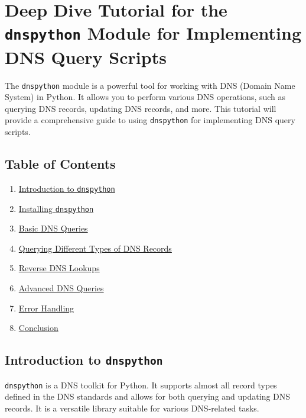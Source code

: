 \documentclass[
  letterpaper,
  DIV=11,
  numbers=noendperiod]{scrreprt}
\providecommand{\tightlist}{%
  \setlength{\itemsep}{0pt}\setlength{\parskip}{0pt}}\usepackage{longtable,booktabs,array}
\begin{document}

\chapter{\texorpdfstring{Deep Dive Tutorial for the \texttt{dnspython}
Module for Implementing DNS Query
Scripts}{Deep Dive Tutorial for the dnspython Module for Implementing DNS Query Scripts}}\label{deep-dive-tutorial-for-the-dnspython-module-for-implementing-dns-query-scripts}

The \texttt{dnspython} module is a powerful tool for working with DNS
(Domain Name System) in Python. It allows you to perform various DNS
operations, such as querying DNS records, updating DNS records, and
more. This tutorial will provide a comprehensive guide to using
\texttt{dnspython} for implementing DNS query scripts.

\section{Table of Contents}\label{table-of-contents-19}

\begin{enumerate}
\def\labelenumi{\arabic{enumi}.}
\tightlist
\item
  \hyperref[introduction-to-dnspython]{Introduction to
  \texttt{dnspython}}
\item
  \hyperref[installing-dnspython]{Installing \texttt{dnspython}}
\item
  \hyperref[basic-dns-queries]{Basic DNS Queries}
\item
  \hyperref[querying-different-types-of-dns-records]{Querying Different
  Types of DNS Records}
\item
  \hyperref[reverse-dns-lookups]{Reverse DNS Lookups}
\item
  \hyperref[advanced-dns-queries]{Advanced DNS Queries}
\item
  \hyperref[error-handling]{Error Handling}
\item
  \hyperref[conclusion]{Conclusion}
\end{enumerate}

\section{\texorpdfstring{Introduction to
\texttt{dnspython}}{Introduction to dnspython}}\label{introduction-to-dnspython}

\texttt{dnspython} is a DNS toolkit for Python. It supports almost all
record types defined in the DNS standards and allows for both querying
and updating DNS records. It is a versatile library suitable for various
DNS-related tasks.
\end{document}
